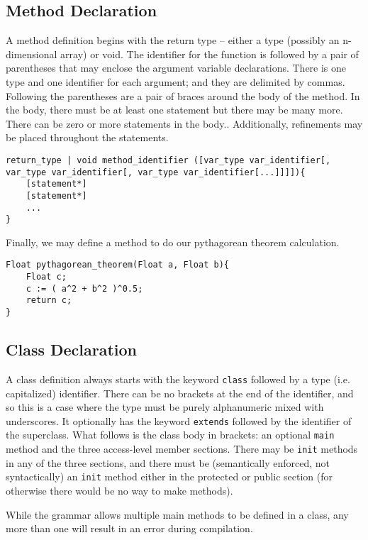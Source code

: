 \subsection{Method Declaration}
A method definition begins with the return type -- either a type (possibly an n-dimensional array) or void. The identifier for the function is followed by a pair of parentheses that may enclose the argument variable declarations. There is one type and one identifier for each argument; and they are delimited by commas. Following the parentheses are a pair of braces around the body of the method. In the body, there must be at least one statement but there may be many more. There can be zero or more statements in the body.. Additionally, refinements may be placed throughout the statements.
 
\begin{lstlisting}
return_type | void method_identifier ([var_type var_identifier[, var_type var_identifier[, var_type var_identifier[...]]]]){
    [statement*]
    [statement*]
    ...
}
\end{lstlisting}

Finally, we may define a method to do our pythagorean theorem calculation.

\begin{lstlisting}[label=Method Invocation,caption=Method Definition for the Pythagorean Theorem]
Float pythagorean_theorem(Float a, Float b){
    Float c;
    c := ( a^2 + b^2 )^0.5;
    return c;
}
\end{lstlisting}

\subsection{Class Declaration}
A class definition always starts with the keyword \verb!class! followed by a type (i.e. capitalized) identifier. There can be no brackets at the end of the identifier, and so this is a case where the type must be purely alphanumeric mixed with underscores. It optionally has the keyword \verb!extends! followed by the identifier of the superclass. What follows is the class body in brackets: an optional \verb!main! method and the three access-level member sections. There may be \verb!init! methods in any of the three sections, and there must be (semantically enforced, not syntactically) an \verb!init! method either in the protected or public section (for otherwise there would be no way to make methods).

While the grammar allows multiple main methods to be defined in a class, any more than one will result in an error during compilation.

